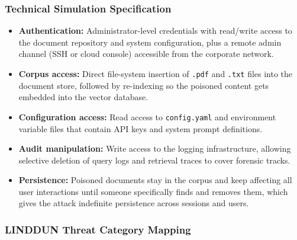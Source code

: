 \documentclass[12pt,a4paper]{report}
\begin{document}
\subsubsection{Technical Simulation Specification}

\begin{prosebox}
\begin{itemize}[leftmargin=1.4em, itemsep=3pt]
  \item \textbf{Authentication:} Administrator-level credentials with
        read/write access to the document repository and system configuration,
        plus a remote admin channel (SSH or cloud console) accessible from
        the corporate network.
  \item \textbf{Corpus access:} Direct file-system insertion of \texttt{.pdf}
        and \texttt{.txt} files into the document store, followed by
        re-indexing so the poisoned content gets embedded into the vector database.
  \item \textbf{Configuration access:} Read access to \texttt{config.yaml}
        and environment variable files that contain API keys and system prompt
        definitions.
  \item \textbf{Audit manipulation:} Write access to the logging
        infrastructure, allowing selective deletion of query logs and
        retrieval traces to cover forensic tracks.
  \item \textbf{Persistence:} Poisoned documents stay in the corpus and
        keep affecting all user interactions until someone specifically finds
        and removes them, which gives the attack indefinite persistence
        across sessions and users.
\end{itemize}
\end{prosebox}

\subsubsection{LINDDUN Threat Category Mapping}
\end{document}
